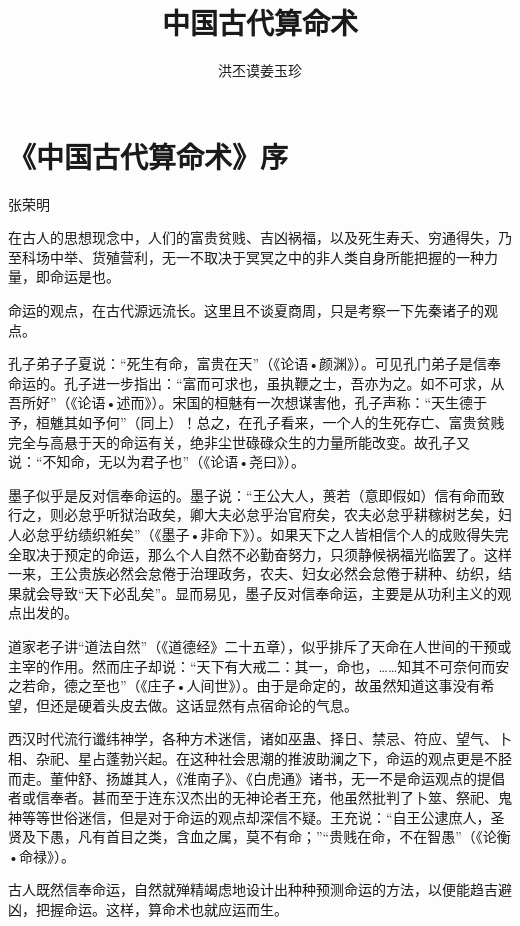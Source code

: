 \documentclass[a5paper,oneside,12pt]{ctexbook}
\title{中国古代算命术}
\author{洪丕谟姜玉珍}
\date{}
\begin{document}
\frontmatter
\maketitle
\tableofcontents
\chapter{《中国古代算命术》序}
\begin{center}
张荣明
\end{center}

在古人的思想现念中，人们的富贵贫贱、吉凶祸福，以及死生寿夭、穷通得失，乃至科场中举、货殖营利，无一不取决于冥冥之中的非人类自身所能把握的一种力量，即命运是也。

命运的观点，在古代源远流长。这里且不谈夏商周，只是考察一下先秦诸子的观点。

孔子弟子子夏说：“死生有命，富贵在天”（《论语•颜渊》）。可见孔门弟子是信奉命运的。孔子进一步指出：“富而可求也，虽执鞭之士，吾亦为之。如不可求，从吾所好”（《论语•述而》）。宋国的桓魅有一次想谋害他，孔子声称：“天生德于予，桓魋其如予何”（同上）！总之，在孔子看来，一个人的生死存亡、富贵贫贱完全与高悬于天的命运有关，绝非尘世碌碌众生的力量所能改变。故孔子又说：“不知命，无以为君子也”（《论语•尧曰》）。

墨子似乎是反对信奉命运的。墨子说：“王公大人，蒉若（意即假如）信有命而致行之，则必怠乎听狱治政矣，卿大夫必怠乎治官府矣，农夫必怠乎耕稼树艺矣，妇人必怠乎纺绩织絍矣”（《墨子•非命下》）。如果天下之人皆相信个人的成败得失完全取决于预定的命运，那么个人自然不必勤奋努力，只须静候祸福光临罢了。这样一来，王公贵族必然会怠倦于治理政务，农夫、妇女必然会怠倦于耕种、纺织，结果就会导致“天下必乱矣”。显而易见，墨子反对信奉命运，主要是从功利主义的观点出发的。

道家老子讲“道法自然”（《道德经》二十五章），似乎排斥了天命在人世间的干预或主宰的作用。然而庄子却说：“天下有大戒二：其一，命也，……知其不可奈何而安之若命，德之至也”（《庄子•人间世》）。由于是命定的，故虽然知道这事没有希望，但还是硬着头皮去做。这话显然有点宿命论的气息。

西汉时代流行谶纬神学，各种方术迷信，诸如巫蛊、择日、禁忌、符应、望气、卜相、杂祀、星占蓬勃兴起。在这种社会思潮的推波助澜之下，命运的观点更是不胫而走。董仲舒、扬雄其人，《淮南子》、《白虎通》诸书，无一不是命运观点的提倡者或信奉者。甚而至于连东汉杰出的无神论者王充，他虽然批判了卜筮、祭祀、鬼神等等世俗迷信，但是对于命运的观点却深信不疑。王充说：“自王公逮庶人，圣贤及下愚，凡有首目之类，含血之属，莫不有命；”“贵贱在命，不在智愚”（《论衡•命禄》）。

古人既然信奉命运，自然就殚精竭虑地设计出种种预测命运的方法，以便能趋吉避凶，把握命运。这样，算命术也就应运而生。
\end{document}
